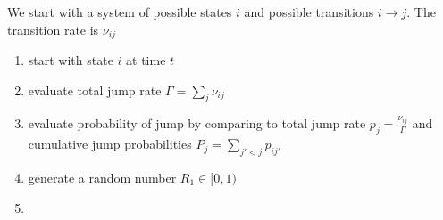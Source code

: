 We start with a system of possible states \(i\) and possible transitions \(i \rightarrow j\). The transition rate is \(\nu_{ij}\)

\begin{enumerate}
	\item start with state \(i\) at time \(t\)
	\item evaluate total jump rate \( \Gamma = \sum\limits_{j}\nu_{ij}\)
	\item evaluate probability of jump by comparing to total jump rate \( p_{j} = \frac{\nu_{ij}}{\Gamma}\) and cumulative jump probabilities \( P_{j}= \sum\limits_{j'<j}p_{ij'}\)
	\item generate a random number \(R_{1} \in [0,1)\)
	\item 
\end{enumerate} 

\printbibliography


